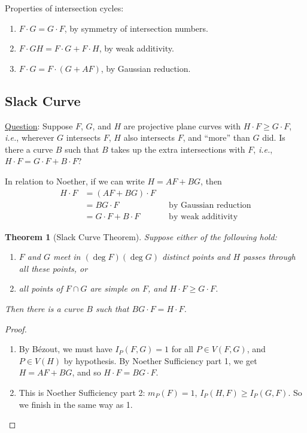 \documentclass[12pt]{article}
\newcommand{\ita}[1]{\textit{#1}}
\newtheorem{theorem}{Theorem}[section]
\theoremstyle{definition}
\begin{document}
Properties of intersection cycles:
\begin{enumerate}
    \item $F\cdot G=G\cdot F$, by symmetry of intersection numbers.
    \item $F\cdot GH=F\cdot G+F\cdot H$, by weak additivity.
    \item $F\cdot G=F\cdot(G+AF)$, by Gaussian reduction.
\end{enumerate}
\subsection{Slack Curve}
\underline{Question}: Suppose $F$, $G$, and $H$ are projective plane curves with $H\cdot F\geq G\cdot F$, \ita{i.e.}, wherever $G$ intersects $F$, $H$ also intersects $F$, and ``more'' than $G$ did. Is there a curve $B$ such that $B$ takes up the extra intersections with $F$, \ita{i.e.}, $H\cdot F=G\cdot F+B\cdot F$?

In relation to Noether, if we can write $H=AF+BG$, then
\begin{align*}
    H\cdot F&=(AF+BG)\cdot F\\
    &=BG\cdot F&&\text{by Gaussian reduction}\\
    &=G\cdot F+B\cdot F&&\text{by weak additivity}
\end{align*}
\begin{theorem}[Slack Curve Theorem]
    Suppose either of the following hold:
    \begin{enumerate}
        \item $F$ and $G$ meet in $(\deg F)(\deg G)$ distinct points and $H$ passes through all these points, or
        \item all points of $F\cap G$ are simple on $F$, and $H\cdot F\geq G\cdot F$.
    \end{enumerate}
    Then there is a curve $B$ such that $BG\cdot F=H\cdot F$.
\end{theorem}
\begin{proof}
    \begin{enumerate}
        \item By B\'ezout, we must have $I_P(F,G)=1$ for all $P\in V(F,G)$, and $P\in V(H)$ by hypothesis. By Noether Sufficiency part 1, we get $H=AF+BG$, and so $H\cdot F=BG\cdot F$. \checkmark
        \item This is Noether Sufficiency part 2: $m_P(F)=1$, $I_P(H,F)\geq I_P(G,F)$. So we finish in the same way as 1. \checkmark
    \end{enumerate}
\end{proof}
\end{document}
